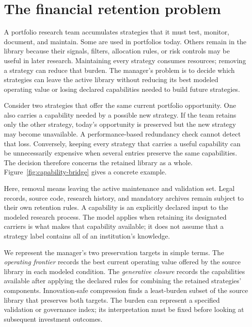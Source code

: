 \section{The financial retention problem}
\label{sec:introduction}

A portfolio research team accumulates strategies that it must test, monitor,
document, and maintain. Some are used in portfolios today. Others remain in the
library because their signals, filters, allocation rules, or risk controls may
be useful in later research. Maintaining every strategy consumes resources;
removing a strategy can reduce that burden. The manager's problem is to decide
which strategies can leave the active library without reducing its best modeled
operating value or losing declared capabilities needed to build future strategies.

Consider two strategies that offer the same current portfolio opportunity.
One also carries a capability needed by a possible new strategy. If the team
retains only the other strategy, today's opportunity is preserved but the new
strategy may become unavailable. A performance-based redundancy check cannot
detect that loss. Conversely, keeping every strategy that carries a useful
capability can be unnecessarily expensive when several entries preserve the
same capabilities. The decision therefore concerns the retained library as a
whole. Figure~\ref{fig:capability-bridge} gives a concrete example.



Here, removal means leaving the active maintenance and validation set. Legal
records, source code, research history, and mandatory archives remain subject
to their own retention rules. A capability is an explicitly declared input to
the modeled research process. The model applies when retaining its designated
carriers is what makes that capability available; it does not assume that a
strategy label contains all of an institution's knowledge.

We represent the manager's two preservation targets in simple terms. The
\emph{operating frontier} records the best current operating value offered by
the source library in each modeled condition. The \emph{generative closure}
records the capabilities available after applying the declared rules for
combining the retained strategies' components. Innovation-safe compression
finds a least-burden subset of the source library that preserves both targets.
The burden can represent a specified validation or governance index; its
interpretation must be fixed before looking at subsequent investment outcomes.

